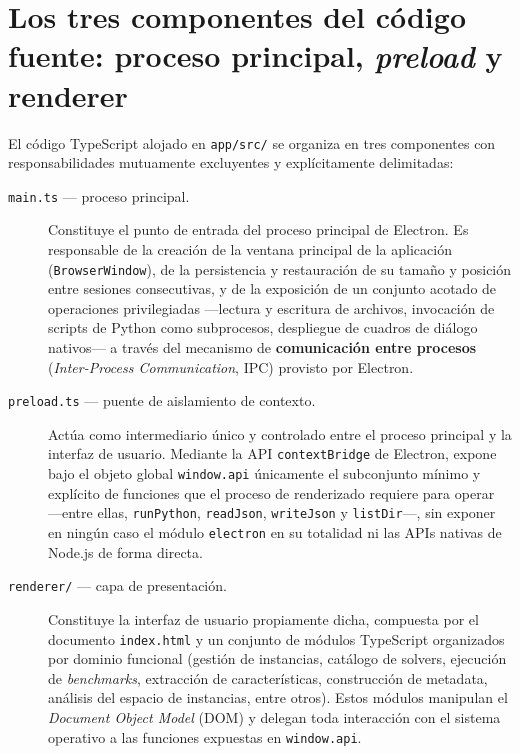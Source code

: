 \section{Los tres componentes del c\'odigo fuente: proceso principal,
\emph{preload} y renderer}

El c\'odigo TypeScript alojado en \texttt{app/src/} se organiza en tres
componentes con responsabilidades mutuamente excluyentes y expl\'icitamente
delimitadas:

\begin{description}
    \item[\texttt{main.ts} — proceso principal.] Constituye el punto de
    entrada del proceso principal de Electron. Es responsable de la creaci\'on
    de la ventana principal de la aplicaci\'on (\texttt{BrowserWindow}), de la
    persistencia y restauraci\'on de su tama\~no y posici\'on entre sesiones
    consecutivas, y de la exposici\'on de un conjunto acotado de operaciones
    privilegiadas —lectura y escritura de archivos, invocaci\'on de scripts
    de Python como subprocesos, despliegue de cuadros de di\'alogo
    nativos— a trav\'es del mecanismo de \textbf{comunicaci\'on entre
    procesos} (\emph{Inter-Process Communication}, IPC) provisto por
    Electron.

    \item[\texttt{preload.ts} — puente de aislamiento de contexto.] Act\'ua
    como intermediario \'unico y controlado entre el proceso principal y la
    interfaz de usuario. Mediante la API \texttt{contextBridge} de Electron,
    expone bajo el objeto global \texttt{window.api} \'unicamente el
    subconjunto m\'inimo y expl\'icito de funciones que el proceso de
    renderizado requiere para operar —entre ellas, \texttt{runPython},
    \texttt{readJson}, \texttt{writeJson} y \texttt{listDir}—, sin exponer en
    ning\'un caso el m\'odulo \texttt{electron} en su totalidad ni las APIs
    nativas de Node.js de forma directa.

    \item[\texttt{renderer/} — capa de presentaci\'on.] Constituye la
    interfaz de usuario propiamente dicha, compuesta por el documento
    \texttt{index.html} y un conjunto de m\'odulos TypeScript organizados por
    dominio funcional (gesti\'on de instancias, cat\'alogo de solvers,
    ejecuci\'on de \emph{benchmarks}, extracci\'on de caracter\'isticas,
    construcci\'on de metadata, an\'alisis del espacio de instancias, entre
    otros). Estos m\'odulos manipulan el \emph{Document Object Model} (DOM) y
    delegan toda interacci\'on con el sistema operativo a las funciones
    expuestas en \texttt{window.api}.
\end{description}

